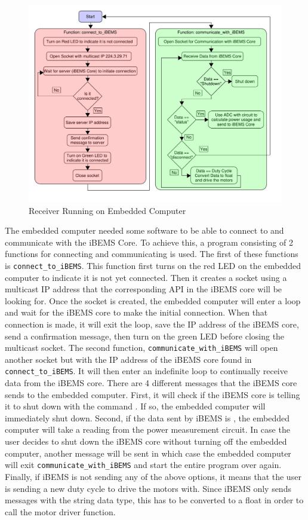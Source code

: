 \documentclass[conference]{IEEEtran}
\begin{document}
\begin{figure}[htbp]
    \centering
    \includegraphics[scale=0.2]{figs/beaglebone/Beaglebone_Receiver_Diagram.pdf}
    \caption{Receiver Running on Embedded Computer}
    \label{fig:Beaglebone_Receiver_Diagram}
\end{figure}

The embedded computer needed some software to be able to connect to and communicate with the iBEMS Core. To achieve this, a program consisting of 2 functions for connecting and communicating is used.
\medbreak
The first of these functions is \texttt{connect\_to\_iBEMS}. This function first turns on the red LED on the embedded computer to indicate it is not yet connected. Then it creates a socket using a multicast IP address that the corresponding API in the iBEMS core will be looking for. Once the socket is created, the embedded computer will enter a loop and wait for the iBEMS core to make the initial connection. When that connection is made, it will exit the loop, save the IP address of the iBEMS core, send a confirmation message, then turn on the green LED before closing the multicast socket.
\medbreak
The second function, \texttt{communicate\_with\_iBEMS} will open another socket but with the IP address of the iBEMS core found in \texttt{connect\_to\_iBEMS}. It will then enter an indefinite loop to continually receive data from the iBEMS core. There are 4 different messages that the iBEMS core sends to the embedded computer. First, it will check if the iBEMS core is telling it to shut down with the command . If so, the embedded computer will immediately shut down. Second, if the data sent by iBEMS is , the embedded computer will take a reading from the power measurement circuit. In case the user decides to shut down the iBEMS core without turning off the embedded computer, another message  will be sent in which case the embedded computer will exit \texttt{communicate\_with\_iBEMS} and start the entire program over again. Finally, if iBEMS is not sending any of the above options, it means that the user is sending a new duty cycle to drive the motors with. Since iBEMS only sends messages with the string data type, this has to be converted to a float in order to call the motor driver function. 
\end{document}
